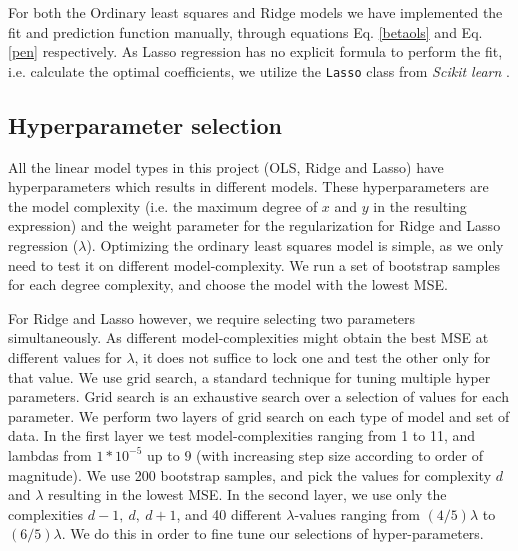 For both the Ordinary least squares and Ridge models we have implemented the fit and prediction function manually, through equations Eq. \ref{betaols} and Eq. \ref{pen} respectively.
As Lasso regression has no explicit formula to perform the fit, i.e. calculate the optimal coefficients, we utilize the \texttt{Lasso} class from \textit{Scikit learn} \cite{sklearn}.

\subsection{Hyperparameter selection}
All the linear model types in this project (OLS, Ridge and Lasso) have hyperparameters which results in different models. 
These hyperparameters are the model complexity (i.e. the maximum degree of $x$ and $y$ in the resulting expression) and the weight parameter for the regularization for Ridge and Lasso regression ($\lambda$). 
Optimizing the ordinary least squares model is simple, as we only need to test it on different model-complexity. 
We run a set of bootstrap samples for each degree complexity, and choose the model with the lowest MSE.

For Ridge and Lasso however, we require selecting two parameters simultaneously. As different model-complexities might obtain the best MSE at different values for $\lambda$, it does not suffice to lock one and test the other only for that value. 
We use grid search, a standard technique for tuning multiple hyper parameters. \citep[p. 302]{grid_search} 
Grid search is an exhaustive search over a selection of values for each parameter. 
We perform two layers of grid search on each type of model and set of data. 
In the first layer we test model-complexities ranging from 1 to 11, and lambdas from $1*10^{-5}$ up to $9$ (with increasing step size according to order of magnitude). 
We use 200 bootstrap samples, and pick the values for complexity $d$ and $\lambda$ resulting in the lowest MSE. 
In the second layer, we use only the complexities $d-1,\ d,\ d+1$, and 40 different $\lambda$-values ranging from $(4/5)\lambda$ to $(6/5)\lambda$. 
We do this in order to fine tune our selections of hyper-parameters.
